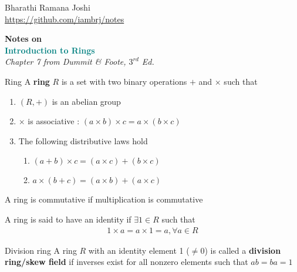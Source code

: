 \documentclass[titlepage, 12pt]{article}
\begin{document}
\begin{titlepage}

	\raggedleft

	\vspace*{\baselineskip}

	{Bharathi Ramana Joshi\\\url{https://github.com/iambrj/notes}}

	\vspace*{0.167\textheight}

	\textbf{\LARGE Notes on}\\[\baselineskip]

	\textbf{\textcolor{teal}{\huge Introduction to Rings}}\\[\baselineskip]

    {\Large \textit{Chapter 7 from Dummit \& Foote, $3^{rd}$ Ed.}}

	\vfill

	\vspace*{3\baselineskip}

\end{titlepage}

\newpage

\begin{definition}{Ring}{}
    A \textbf{ring} $R$ is a set with two binary operations $+$ and $\times$
    such that
    \begin{enumerate}
        \item $(R, +)$ is an abelian group
        \item $\times$ is associative : $(a\times b)\times c = a\times (b\times
            c)$
        \item The following distributive laws hold
            \begin{enumerate}
                \item $(a+b)\times c = (a\times c) + (b\times c)$
                \item $a\times (b+c) = (a\times b) + (a\times c)$
            \end{enumerate}
    \end{enumerate}
\end{definition}

A ring is commutative if multiplication is commutative

A ring is said to have an identity if $\exists 1\in R$ such that
\begin{gather*}
    1\times a = a\times 1 = a, \forall a\in R
\end{gather*}

\begin{definition}{Division ring}{}
    A ring $R$ with an identity element 1 ($\neq 0$) is called a
    \textbf{division ring/skew field} if inverses exist for all nonzero elements
    such that $ab=ba=1$
\end{definition}
\end{document}
